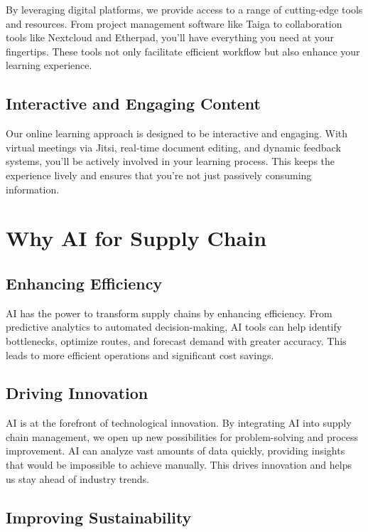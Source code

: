 \documentclass[
  letterpaper,
  DIV=11,
  numbers=noendperiod]{scrreprt}
\begin{document}
By leveraging digital platforms, we provide access to a range of
cutting-edge tools and resources. From project management software like
Taiga to collaboration tools like Nextcloud and Etherpad, you'll have
everything you need at your fingertips. These tools not only facilitate
efficient workflow but also enhance your learning experience.

\subsection{Interactive and Engaging
Content}\label{interactive-and-engaging-content}

Our online learning approach is designed to be interactive and engaging.
With virtual meetings via Jitsi, real-time document editing, and dynamic
feedback systems, you'll be actively involved in your learning process.
This keeps the experience lively and ensures that you're not just
passively consuming information.

\section{Why AI for Supply Chain}\label{why-ai-for-supply-chain}

\subsection{Enhancing Efficiency}\label{enhancing-efficiency}

AI has the power to transform supply chains by enhancing efficiency.
From predictive analytics to automated decision-making, AI tools can
help identify bottlenecks, optimize routes, and forecast demand with
greater accuracy. This leads to more efficient operations and
significant cost savings.

\subsection{Driving Innovation}\label{driving-innovation}

AI is at the forefront of technological innovation. By integrating AI
into supply chain management, we open up new possibilities for
problem-solving and process improvement. AI can analyze vast amounts of
data quickly, providing insights that would be impossible to achieve
manually. This drives innovation and helps us stay ahead of industry
trends.

\subsection{Improving Sustainability}\label{improving-sustainability}
\end{document}
